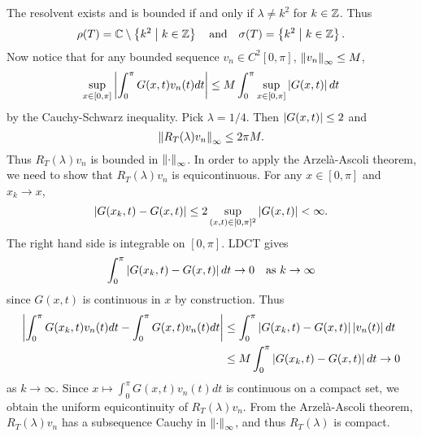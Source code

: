 \begin{example}
    The resolvent exists and is bounded if and only if $\lambda \neq k^2$ 
    for $k\in\mathbb{Z}$. Thus 
    \begin{equation*}
        \rho(T) = \mathbb{C}\setminus\left\{ k^2 \;\middle\vert\; k\in\mathbb{Z} \right\}\quad\text{and}\quad 
        \sigma(T) = \left\{ k^2 \;\middle\vert\; k\in\mathbb{Z} \right\}.
    \end{equation*}
    Now notice that for any bounded sequence $v_n\in C^2[0,\pi]$, $\left\lVert {v_n} \right\rVert_\infty\leq M$, 
    \begin{equation*}
        \begin{split}
            \sup_{x\in[0,\pi]}\left\lvert {\int_0^\pi G(x,t)v_n(t)dt} \right\rvert
            &\leq M\int_0^\pi \sup_{x\in[0,\pi]}\left\lvert {G(x,t)} \right\rvert dt \\
        \end{split}
    \end{equation*}
    by the Cauchy-Schwarz inequality. Pick $\lambda = 1/4$. Then $\left\lvert {G(x,t)} \right\rvert \leq 2$ 
    and 
    \begin{equation*}
        \left\lVert {R_T(\lambda)v_n} \right\rVert_\infty \leq 2\pi M.
    \end{equation*}
    Thus $R_T(\lambda)v_n$ is bounded in $\left\lVert {\cdot} \right\rVert_\infty$. In order 
    to apply the Arzelà-Ascoli theorem, we need to show that $R_T(\lambda)v_n$ 
    is equicontinuous. For any $x\in[0,\pi]$ and $x_k\to x$, 
    \begin{equation*}
        \left\lvert {G(x_k,t) - G(x,t)} \right\rvert \leq 2\sup_{(x,t)\in[0,\pi]^2}\left\lvert {G(x,t)} \right\rvert < \infty.
    \end{equation*}
    The right hand side is integrable on $[0,\pi]$. LDCT gives 
    \begin{equation*}
        \int_0^\pi \left\lvert {G(x_k,t) - G(x,t)} \right\rvert dt \to 0\quad\text{as } k\to\infty
    \end{equation*}
    since $G(x,t)$ is continuous in $x$ by construction. Thus 
    \begin{equation*}
        \begin{split}
            \left\lvert {\int_0^\pi G(x_k,t)v_n(t)dt - \int_0^\pi G(x,t)v_n(t)dt} \right\rvert 
            &\leq \int_0^\pi \left\lvert {G(x_k,t) - G(x,t)} \right\rvert\left\lvert {v_n(t)} \right\rvert dt \\ 
            &\leq M\int_0^\pi \left\lvert {G(x_k,t) - G(x,t)} \right\rvert dt\to 0
        \end{split}
    \end{equation*}
    as $k\to\infty$. Since $x\mapsto \int_0^\pi G(x,t)v_n(t)dt$ is continuous 
    on a compact set, we obtain the uniform equicontinuity of $R_T(\lambda)v_n$. 
    From the Arzelà-Ascoli theorem, $R_T(\lambda)v_n$ has a subsequence Cauchy 
    in $\left\lVert {\cdot} \right\rVert_\infty$, and thus $R_T(\lambda)$ is compact. 
    

\end{example}
